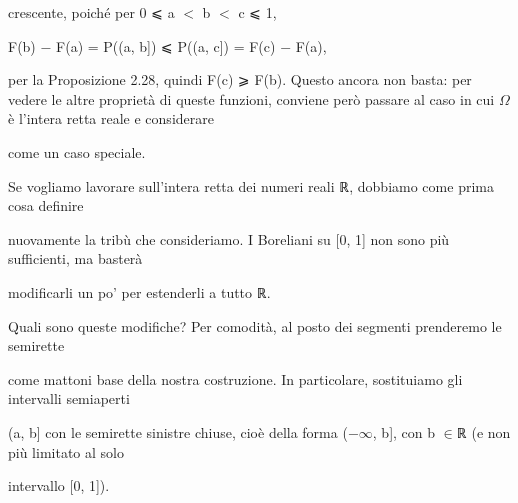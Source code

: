 \documentclass[a4paper,portrait,12pt]{article}
\begin{document}
\begin{flushleft}
crescente, poich\'{e} per 0 ⩽ a $<$ b $<$ c ⩽ 1,
\end{flushleft}


\begin{flushleft}
F(b) $-$ F(a) = P((a, b]) ⩽ P((a, c]) = F(c) $-$ F(a),
\end{flushleft}


\begin{flushleft}
per la Proposizione 2.28, quindi F(c) ⩾ F(b). Questo ancora non basta: per vedere le altre propriet\`{a} di queste funzioni, conviene per\`{o} passare al caso in cui $\Omega$ \`{e} l'intera retta reale e considerare
\end{flushleft}


\begin{flushleft}
[0, 1] come un caso speciale.
\end{flushleft}


\begin{flushleft}
Se vogliamo lavorare sull'intera retta dei numeri reali ℝ, dobbiamo come prima cosa definire
\end{flushleft}


\begin{flushleft}
nuovamente la tribù che consideriamo. I Boreliani su [0, 1] non sono più sufficienti, ma baster\`{a}
\end{flushleft}


\begin{flushleft}
modificarli un po' per estenderli a tutto ℝ.
\end{flushleft}


\begin{flushleft}
Quali sono queste modifiche? Per comodit\`{a}, al posto dei segmenti prenderemo le semirette
\end{flushleft}


\begin{flushleft}
come mattoni base della nostra costruzione. In particolare, sostituiamo gli intervalli semiaperti
\end{flushleft}


\begin{flushleft}
(a, b] con le semirette sinistre chiuse, cio\`{e} della forma ($-$$\infty$, b], con b $\in$ℝ (e non più limitato al solo
\end{flushleft}


\begin{flushleft}
intervallo [0, 1]).
\end{flushleft}
\end{document}

